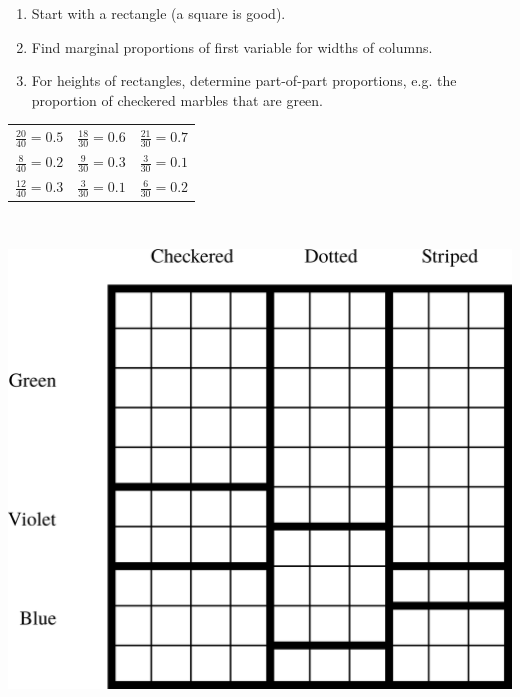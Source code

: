 \begin{frame}
\small
\begin{enumerate}
\item Start with a rectangle (a square is good).
\item Find marginal proportions of first variable for widths of columns.
\item For heights of rectangles, determine part-of-part proportions, e.g. the proportion of checkered marbles that are green.
\end{enumerate}
\begin{center}
\begin{tabular}{c c c}
$\frac{20}{40} = 0.5$ &  $\frac{18}{30} = 0.6$ & $\frac{21}{30} = 0.7$ \\
$\frac{8}{40} = 0.2$ &  $\frac{9}{30} = 0.3$ & $\frac{3}{30} = 0.1$ \\
$\frac{12}{40} = 0.3$ &  $\frac{3}{30} = 0.1$ & $\frac{6}{30} = 0.2$ \\
\end{tabular}
\end{center}
\\ \vfill
\begin{center}
\includegraphics[scale=0.3]{1-7_categorical_data/figures/mosaic/unshaded.png}
\end{center}
\end{frame}

